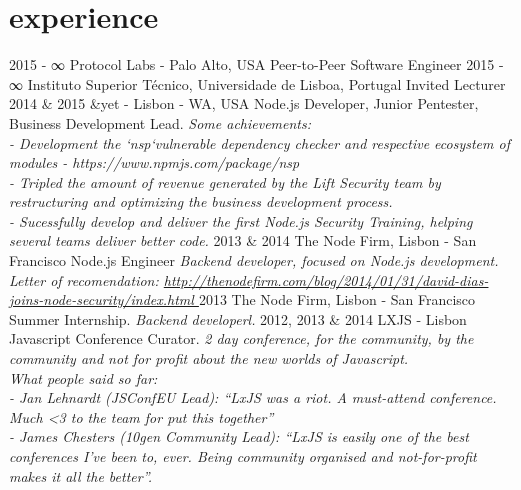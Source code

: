 \documentclass[]{friggeri-cv}
\begin{document}
\section{experience}

\begin{entrylist}
  \entry
    {2015 - ∞ }
    {Protocol Labs - Palo Alto, USA}
    {Peer-to-Peer Software Engineer}
    {\emph{}}
  \entry
    {2015 - ∞ }
    {Instituto Superior Técnico, Universidade de Lisboa, Portugal}
    {Invited Lecturer}
    {\emph{}}
  \entry
    {2014 \& 2015}
    {\&yet - Lisbon -  WA, USA}
    {Node.js Developer, Junior Pentester, Business Development Lead.}
    {\emph{Some achievements:\\
        - Development the `nsp`vulnerable dependency checker and respective ecosystem of modules - https://www.npmjs.com/package/nsp\\
        - Tripled the amount of revenue generated by the Lift Security team by restructuring and optimizing the business development process.\\
        - Sucessfully develop and deliver the first Node.js Security Training, helping several teams deliver better code.}}
  \entry
    {2013 \& 2014}
    {The Node Firm, Lisbon - San Francisco}
    {Node.js Engineer}
    {\emph{Backend developer, focused on Node.js development. Letter of recomendation: \href{http://thenodefirm.com/blog/2014/01/31/david-dias-joins-node-security/index.html}{http://thenodefirm.com/blog/2014/01/31/david-dias-joins-node-security/index.html }}}
  \entry
    {2013}
    {The Node Firm, Lisbon - San Francisco}
    {Summer Internship.}
    {\emph{Backend developerl.}}
  \entry
  {2012, 2013 \& 2014}
    {LXJS - Lisbon Javascript Conference}
    {Curator.}
    {\emph{2 day conference, for the community, by the community and not for profit about the new worlds of Javascript.\\
    What people said so far: \\
      - Jan Lehnardt (JSConfEU Lead): “LxJS was a riot. A must-attend conference. Much <3 to the team for put this together”\\
      - James Chesters (10gen Community Lead): “LxJS is easily one of the best conferences I’ve been to, ever. Being community  organised and not-for-profit makes it all the better”.}}
\end{entrylist}
\end{document}
